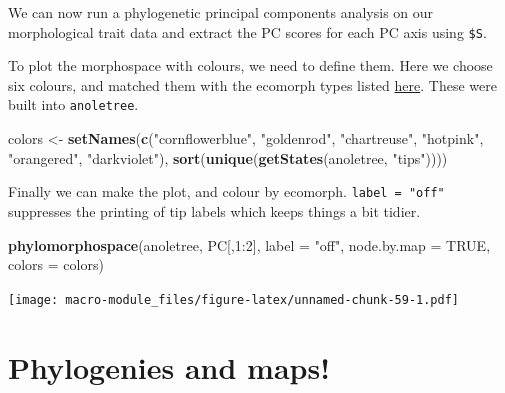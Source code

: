 \documentclass[]{book}
\newenvironment{Shaded}{\begin{snugshade}}{\end{snugshade}}
\newcommand{\KeywordTok}[1]{\textcolor[rgb]{0.13,0.29,0.53}{\textbf{{#1}}}}
\newcommand{\DataTypeTok}[1]{\textcolor[rgb]{0.13,0.29,0.53}{{#1}}}
\newcommand{\DecValTok}[1]{\textcolor[rgb]{0.00,0.00,0.81}{{#1}}}
\newcommand{\StringTok}[1]{\textcolor[rgb]{0.31,0.60,0.02}{{#1}}}
\newcommand{\OtherTok}[1]{\textcolor[rgb]{0.56,0.35,0.01}{{#1}}}
\newcommand{\NormalTok}[1]{{#1}}
\begin{document}
We can now run a phylogenetic principal components analysis on our
morphological trait data and extract the PC scores for each PC axis
using \texttt{\$S}.

\begin{Shaded}
\end{Shaded}

To plot the morphospace with colours, we need to define them. Here we
choose six colours, and matched them with the ecomorph types listed
\href{https://en.wikipedia.org/wiki/Anolis_ecomorphs}{here}. These were
built into \texttt{anoletree}.

\begin{Shaded}
\begin{Highlighting}[]
\NormalTok{colors <-}\StringTok{ }\KeywordTok{setNames}\NormalTok{(}\KeywordTok{c}\NormalTok{(}\StringTok{"cornflowerblue"}\NormalTok{, }\StringTok{"goldenrod"}\NormalTok{, }\StringTok{"chartreuse"}\NormalTok{, }\StringTok{"hotpink"}\NormalTok{,}
                     \StringTok{"orangered"}\NormalTok{, }\StringTok{"darkviolet"}\NormalTok{), }
                     \KeywordTok{sort}\NormalTok{(}\KeywordTok{unique}\NormalTok{(}\KeywordTok{getStates}\NormalTok{(anoletree, }\StringTok{"tips"}\NormalTok{))))}
\end{Highlighting}
\end{Shaded}

Finally we can make the plot, and colour by ecomorph.
\texttt{label\ =\ "off"} suppresses the printing of tip labels which
keeps things a bit tidier.

\begin{Shaded}
\begin{Highlighting}[]
\KeywordTok{phylomorphospace}\NormalTok{(anoletree, PC[,}\DecValTok{1}\NormalTok{:}\DecValTok{2}\NormalTok{], }\DataTypeTok{label =} \StringTok{"off"}\NormalTok{, }\DataTypeTok{node.by.map =} \OtherTok{TRUE}\NormalTok{, }\DataTypeTok{colors =} \NormalTok{colors)}
\end{Highlighting}
\end{Shaded}

\texttt{[image: macro-module\_files/figure-latex/unnamed-chunk-59-1.pdf]}

\section{Phylogenies and maps!}\label{phylogenies-and-maps}
\end{document}
